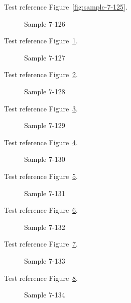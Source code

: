 Test reference Figure~\ref{fig:sample-7-125}.

\begin{figure}[tbhp]
\caption{Sample 7-126}
\label{fig:sample-7-126}
\end{figure}

Test reference Figure~\ref{fig:sample-7-126}.

\begin{figure}[tbhp]
\caption{Sample 7-127}
\label{fig:sample-7-127}
\end{figure}

Test reference Figure~\ref{fig:sample-7-127}.

\begin{figure}[tbhp]
\caption{Sample 7-128}
\label{fig:sample-7-128}
\end{figure}

Test reference Figure~\ref{fig:sample-7-128}.

\begin{figure}[tbhp]
\caption{Sample 7-129}
\label{fig:sample-7-129}
\end{figure}

Test reference Figure~\ref{fig:sample-7-129}.

\begin{figure}[tbhp]
\caption{Sample 7-130}
\label{fig:sample-7-130}
\end{figure}

Test reference Figure~\ref{fig:sample-7-130}.

\begin{figure}[tbhp]
\caption{Sample 7-131}
\label{fig:sample-7-131}
\end{figure}

Test reference Figure~\ref{fig:sample-7-131}.

\begin{figure}[tbhp]
\caption{Sample 7-132}
\label{fig:sample-7-132}
\end{figure}

Test reference Figure~\ref{fig:sample-7-132}.

\begin{figure}[tbhp]
\caption{Sample 7-133}
\label{fig:sample-7-133}
\end{figure}

Test reference Figure~\ref{fig:sample-7-133}.

\begin{figure}[tbhp]
\caption{Sample 7-134}
\label{fig:sample-7-134}
\end{figure}

